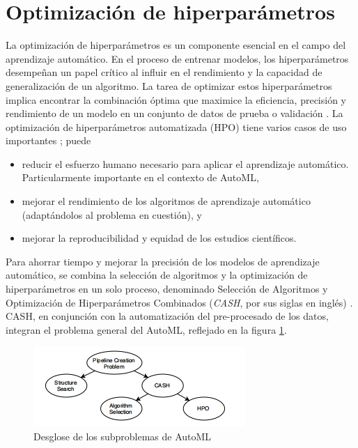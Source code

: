 \section{Optimización de hiperparámetros} \label{epig:hpo}
La optimización de hiperparámetros es un componente esencial en el campo del aprendizaje automático. En el proceso de entrenar modelos, los hiperparámetros desempeñan un papel crítico al influir en el rendimiento y la capacidad de generalización de un algoritmo. La tarea de optimizar estos hiperparámetros implica encontrar la combinación óptima que maximice la eficiencia, precisión y rendimiento de un modelo en un conjunto de datos de prueba o validación  \citep{hastie2009elements}. La optimización de hiperparámetros automatizada (HPO) tiene varios casos de uso importantes  \citep{hutter2019automated}; puede
\begin{itemize}
	\item reducir el esfuerzo humano necesario para aplicar el aprendizaje automático. Particularmente importante en el contexto de AutoML,
	\item mejorar el rendimiento de los algoritmos de aprendizaje automático (adaptándolos al problema en cuestión), y
	\item mejorar la reproducibilidad y equidad de los estudios científicos.
\end{itemize}
Para ahorrar tiempo y mejorar la precisión de los modelos de aprendizaje automático, se combina la selección de algoritmos y la optimización de hiperparámetros en un solo proceso, denominado Selección de Algoritmos y Optimización de Hiperparámetros Combinados (\textit{CASH}, por sus siglas en inglés) \citep{tuggener2019automated}. \\
CASH, en conjunción con la automatización del pre-procesado de los datos, integran el problema general del AutoML, reflejado en la figura \ref{fig:desglose-de-los-subproblemas-de-automl}. 
\begin{figure}[H]
	\centering
	\includegraphics[width=0.6\linewidth]{"figuras/capi 1/Desglose de los subproblemas de AutoML"}
	\caption{Desglose de los subproblemas de AutoML \citep{zoller2021benchmark}}
	\label{fig:desglose-de-los-subproblemas-de-automl}
\end{figure} 
